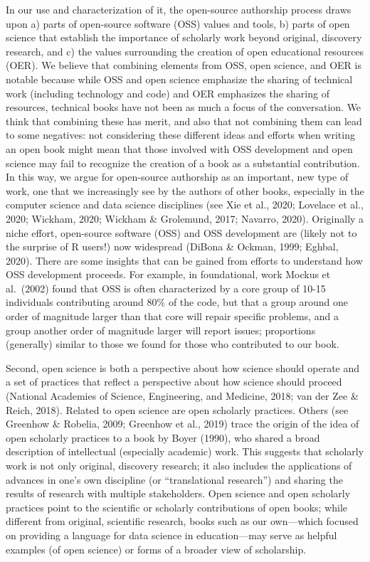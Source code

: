 \documentclass[
  english,
  man]{apa6}
\begin{document}
In our use and characterization of it, the open-source authorship process draws upon a) parts of open-source software (OSS) values and tools, b) parts of open science that establish the importance of scholarly work beyond original, discovery research, and c) the values surrounding the creation of open educational resources (OER). We believe that combining elements from OSS, open science, and OER is notable because while OSS and open science emphasize the sharing of technical work (including technology and code) and OER emphasizes the sharing of resources, technical books have not been as much a focus of the conversation. We think that combining these has merit, and also that not combining them can lead to some negatives: not considering these different ideas and efforts when writing an open book might mean that those involved with OSS development and open science may fail to recognize the creation of a book as a substantial contribution. In this way, we argue for open-source authorship as an important, new type of work, one that we increasingly see by the authors of other books, especially in the computer science and data science disciplines (see Xie et al., 2020; Lovelace et al., 2020; Wickham, 2020; Wickham \& Grolemund, 2017; Navarro, 2020).
Originally a niche effort, open-source software (OSS) and OSS development are (likely not to the surprise of R users!) now widespread (DiBona \& Ockman, 1999; Eghbal, 2020). There are some insights that can be gained from efforts to understand how OSS development proceeds. For example, in foundational, work Mockus et al.~(2002) found that OSS is often characterized by a core group of 10-15 individuals contributing around 80\% of the code, but that a group around one order of magnitude larger than that core will repair specific problems, and a group another order of magnitude larger will report issues; proportions (generally) similar to those we found for those who contributed to our book.

Second, open science is both a perspective about how science should operate and a set of practices that reflect a perspective about how science should proceed (National Academies of Science, Engineering, and Medicine, 2018; van der Zee \& Reich, 2018). Related to open science are open scholarly practices. Others (see Greenhow \& Robelia, 2009; Greenhow et al., 2019) trace the origin of the idea of open scholarly practices to a book by Boyer (1990), who shared a broad description of intellectual (especially academic) work. This suggests that scholarly work is not only original, discovery research; it also includes the applications of advances in one's own discipline (or ``translational research'') and sharing the results of research with multiple stakeholders. Open science and open scholarly practices point to the scientific or scholarly contributions of open books; while different from original, scientific research, books such as our own---which focused on providing a language for data science in education---may serve as helpful examples (of open science) or forms of a broader view of scholarship.
\end{document}
